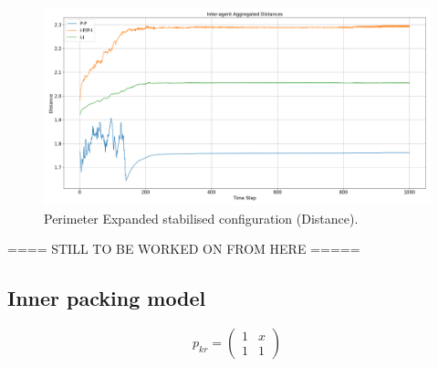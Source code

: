 \documentclass[12pt,a4paper]{IEEEtran}
\begin{document}
\begin{figure}[H]
	\begin{center}
		\includegraphics[width=1.0\linewidth]{figures/perimExpandDistance}
	\end{center}
	\caption{Perimeter Expanded stabilised configuration (Distance). \label{fig:perimExpandDistance}}
\end{figure}


==== STILL TO BE WORKED ON FROM HERE =====\\


\subsection{Inner packing model}

\begin{equation}
p_{kr} = \left (
\begin{array}{cc}
1 & x\\
1 & 1
\end{array} \right )
\end{equation}
\end{document}
